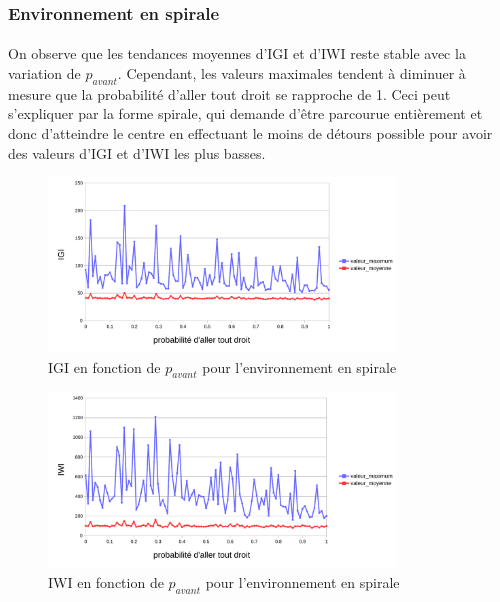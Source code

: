 \documentclass{article}
\begin{document}
    \subsubsection{Environnement en spirale}
    \paragraph{}On observe que les tendances moyennes d'IGI et d'IWI reste stable avec la variation de $p_{avant}$. Cependant, les valeurs maximales tendent à diminuer à mesure que la probabilité d'aller tout droit se rapproche de 1.
    Ceci peut s'expliquer par la forme spirale, qui demande d'être parcourue entièrement et donc d'atteindre le centre en effectuant le moins de détours possible pour avoir des valeurs d'IGI et d'IWI les plus basses.
    \begin{figure}[!h]
        \begin{center}
            \includegraphics[width = 0.82\textwidth]{graphes pdf/variance go-ahead IGI spirale.pdf}
            \caption{IGI en fonction de $p_{avant}$ pour l'environnement en spirale}
        \end{center}
    \end{figure}
    \begin{figure}[!h]
        \begin{center}
            \includegraphics[width = 0.82\textwidth]{graphes pdf/variance go-ahead IWI spirale.pdf}
            \caption{IWI en fonction de $p_{avant}$ pour l'environnement en spirale}
        \end{center}
    \end{figure}
    \newpage
\end{document}
